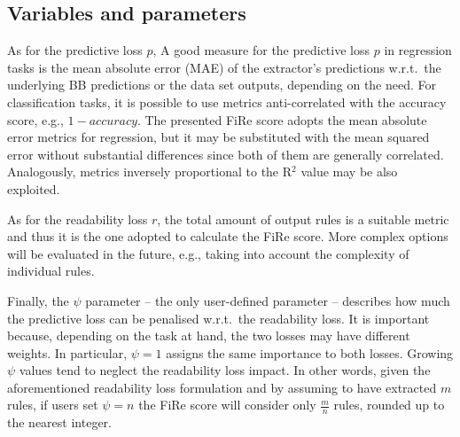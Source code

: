 \documentclass{article}
\newcommand{\fire}{FiRe}
\begin{document}
\subsection{Variables and parameters}\label{sec:fire-var}
As for the predictive loss $p$, A good measure for the predictive loss $p$ in regression tasks is the mean absolute error (MAE) of the extractor's predictions w.r.t.\ the underlying BB predictions or the data set outputs, depending on the need.
%
For classification tasks, it is possible to use metrics anti-correlated with the accuracy score, e.g., $1-accuracy$.
%
The presented \fire{} score adopts the mean absolute error metrics for regression, but it may be substituted with the mean squared error without substantial differences since both of them are generally correlated.
%
Analogously, metrics inversely proportional to the R$^2$ value may be also exploited.

As for the readability loss $r$, the total amount of output rules is a suitable metric and thus it is the one adopted to calculate the \fire{} score.
%
More complex options will be evaluated in the future, e.g., taking into account the complexity of individual rules.

Finally, the $\psi$ parameter -- the only user-defined parameter -- describes how much the predictive loss can be penalised w.r.t.\ the readability loss.
%
It is important because, depending on the task at hand, the two losses may have different weights.
%
In particular, $\psi=1$ assigns the same importance to both losses.
%
Growing $\psi$ values tend to neglect the readability loss impact.
%
In other words, given the aforementioned readability loss formulation and by assuming to have extracted $m$ rules, if users set $\psi=n$ the \fire{} score will consider only $\frac{m}{n}$ rules, rounded up to the nearest integer.

\end{document}
